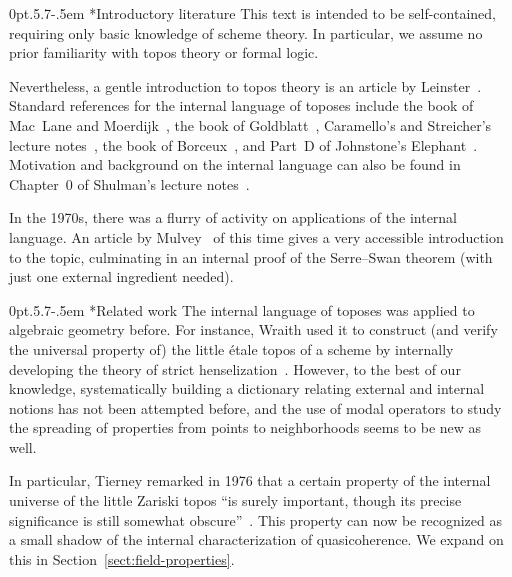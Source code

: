 \documentclass[10pt,reqno,a4paper]{amsbook}
\makeatletter
\theoremstyle{definition}
\theoremstyle{plain}
\theoremstyle{remark}
\newcommand{\?}{\,{:}\,}
\renewcommand{\_}{\mathpunct{.}\,}
\def\subsection{\@startsection{subsection}{2}%
  {0pt}{.5\linespacing\@plus.7\linespacing}{-.5em}%
  {\normalfont\bfseries}}
\makeatother
\begin{document}
{\subsection*{Introductory literature} This text is intended
to be self-contained, requiring only basic knowledge of scheme theory. In
particular, we assume no prior familiarity with topos theory or formal logic.

Nevertheless, a gentle
introduction to topos theory is an article by
Leinster~\cite{leinster:introduction}. Standard references for the internal
language of toposes include the book of Mac~Lane and
Moerdijk~\cite[Chapter~VI]{moerdijk-maclane:sheaves-logic}, the book of
Goldblatt~\cite[Chapter~14]{goldblatt:topoi}, Caramello's and Streicher's lecture
notes~\cite{caramello:preliminaries,streicher:ctcl}, the book of
Borceux~\cite[Chapter~6]{borceux:handbook3}, and Part~D of
Johnstone's Elephant~\cite{johnstone:elephant}. Motivation and background on
the internal language can also be found in Chapter~0 of Shulman's lecture
notes~\cite{shulman:categorical-logic}.

In the 1970s, there was a
flurry of activity on applications of the internal language. An article by
Mulvey~\cite{mulvey:repr} of this time gives a very accessible
introduction to the topic, culminating in an internal proof of the Serre--Swan
theorem (with just one external ingredient needed).


\subsection*{Related work} The internal language of toposes was applied to algebraic geometry before. For
instance, Wraith used it to construct (and verify the universal property
of) the little étale topos of a scheme by internally developing the theory of
strict henselization~\cite{wraith:generic-galois-theory}. However, to the best
of our knowledge, systematically building a dictionary relating external and
internal notions has not been attempted before, and the use of modal operators
to study the spreading of properties from points to neighborhoods seems to be
new as well.

In particular, Tierney remarked in 1976 that a certain property of the internal
universe of the little Zariski topos ``is surely important, though its precise
significance is still somewhat obscure''~\cite[p.~209]{tierney:spectrum}. This
property can now be recognized as a small shadow of the internal
characterization of quasicoherence. We expand on this in
Section~\ref{sect:field-properties}.

}
\end{document}

